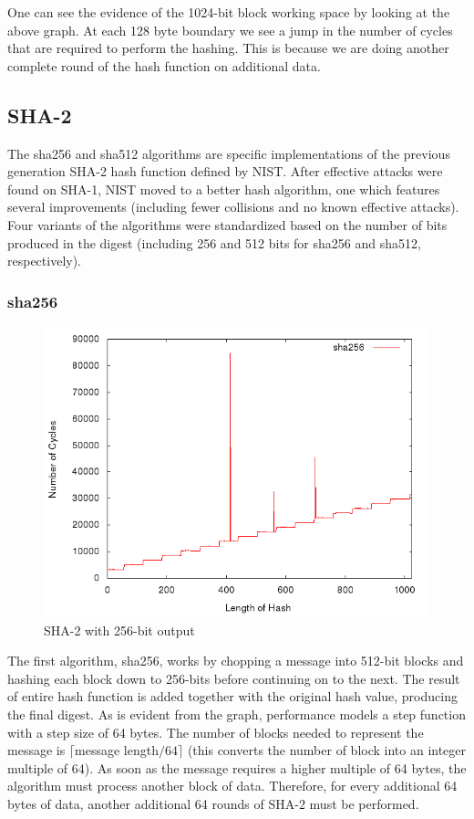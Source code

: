 \documentclass[10pt,a4paper]{article}
\begin{document}
One can see the evidence of the 1024-bit block working space by looking at the
above graph. At each 128 byte boundary we see a jump in the number of cycles
that are required to perform the hashing. This is because we are doing another
complete round of the hash function on additional data.


\subsection{SHA-2}
The sha256 and sha512 algorithms are specific implementations of the previous generation SHA-2 hash function defined by NIST.  After effective attacks were found on SHA-1, NIST moved to a better hash algorithm, one which features several improvements (including fewer collisions and no known effective attacks).  Four variants of the algorithms were standardized based on the number of bits produced in the digest (including 256 and 512 bits for sha256 and sha512, respectively).

\subsubsection{sha256}
    \begin{figure}[H]
        \begin{center}
            \includegraphics[scale=0.5]{images/sha256.png} 
            \caption{SHA-2 with 256-bit output}
        \end{center}
    \end{figure}

The first algorithm, sha256, works by chopping a message into 512-bit blocks and hashing each block down to 256-bits before continuing on to the next.  The result of entire hash function is added together with the original hash value, producing the final digest.  As is evident from the graph, performance models a step function with a step size of 64 bytes.  The number of blocks needed to represent the message is $\lceil$message length$/ 64 \rceil$ (this converts the number of block into an integer multiple of 64).  As soon as the message requires a higher multiple of 64 bytes, the algorithm must process another block of data.  Therefore, for every additional 64 bytes of data, another additional 64 rounds of SHA-2 must be performed.
\end{document}
